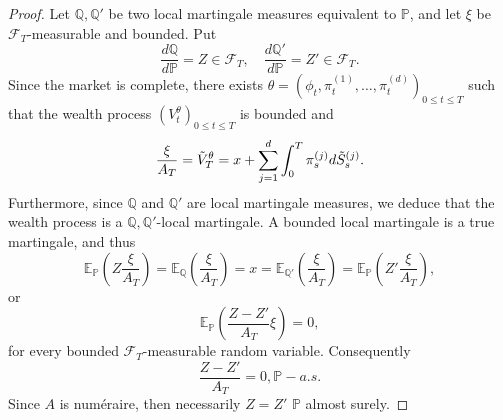\begin{proof}
    Let $\mathbb{Q},\mathbb{Q}'$ be two local martingale measures equivalent to $\mathbb{P}$, and let $\xi$ be $\mathcal{F}_T$-measurable and bounded. Put
    \begin{equation}
        \frac{d\mathbb{Q}}{d\mathbb{P}}=Z\in\mathcal{F}_{T},\quad \frac{d\mathbb{Q}'}{d\mathbb{P}}=Z' \in \mathcal{F}_{T}.
    \end{equation}
    Since the market is complete, there exists $\theta = (\phi_{t},\pi_{t}^{(1)},\dots,\pi_{t}^{(d)})_{0\leq t\leq T}$ such that the wealth process $(V_{t}^{\theta})_{0\leq t\leq T}$ is bounded and
    \begin{equation}
        \frac{\xi}{A_{T}}=\Tilde{V}_{T}^{\theta}=x+\sum_{j=1}^{d}\int_{0}^{T}\pi_{s}^{(j)}d\Tilde{S}_{s}^{(j)}.
    \end{equation}
    Furthermore, since $\mathbb{Q}$ and $\mathbb{Q}'$ are local martingale measures, we deduce that the wealth process is a $\mathbb{Q},\mathbb{Q}'$-local martingale. A bounded local martingale is a true martingale, and thus
    \begin{equation}
        \mathbb{E}_{\mathbb{P}}\left(Z\frac{\xi}{A_T}\right)=\mathbb{E}_{\mathbb{Q}}\left(\frac{\xi}{A_T}\right)=x=\mathbb{E}_{\mathbb{Q}'}\left(\frac{\xi}{A_T}\right)=\mathbb{E}_{\mathbb{P}}\left(Z'\frac{\xi}{A_T}\right),
    \end{equation}
    or 
    \begin{equation}
        \mathbb{E}_{\mathbb{P}}\left(\frac{Z-Z'}{A_T}\xi\right)=0,
    \end{equation}
    for every bounded $\mathcal{F}_T$-measurable random variable. Consequently
    \begin{equation}
        \frac{Z-Z'}{A_T}=0, \mathbb{P}-a.s.
    \end{equation}
Since $A$ is numéraire, then necessarily $Z=Z'$ $\mathbb{P}$ almost surely.
\end{proof}
